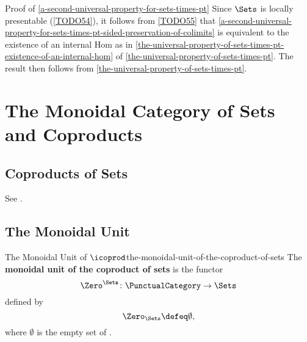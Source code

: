 \begin{Proof}{Proof of \cref{a-second-universal-property-for-sets-times-pt}}%
    Since $\Sets$ is locally presentable (\cref{TODO54}), it follows from \cref{TODO55} that \cref{a-second-universal-property-for-sets-times-pt-sided-preservation-of-colimits} is equivalent to the existence of an internal Hom as in \cref{the-universal-property-of-sets-times-pt-existence-of-an-internal-hom} of \cref{the-universal-property-of-sets-times-pt}. The result then follows from \cref{the-universal-property-of-sets-times-pt}.
\end{Proof}
\section{The Monoidal Category of Sets and Coproducts}\label{section-the-monoidal-category-of-sets-and-coproducts}
\subsection{Coproducts of Sets}\label{subsection-the-monoidal-category-of-sets-and-coproducts-coproducts-of-sets}
See .
\subsection{The Monoidal Unit}\label{subsection-the-monoidal-category-of-sets-and-coproducts-the-monoidal-unit-of-the-coproduct-of-sets}
\begin{definition}{The Monoidal Unit of $\icoprod$}{the-monoidal-unit-of-the-coproduct-of-sets}%
    The \textbf{monoidal unit of the coproduct of sets} is the functor
    \[
        \Zero^{\Sets}
        \colon
        \PunctualCategory
        \to
        \Sets
    \]%
    defined by
    \[
        \Zero_{\Sets}%
        \defeq%
        \emptyset,
    \]%
    where $\emptyset$ is the empty set of .
\end{definition}
